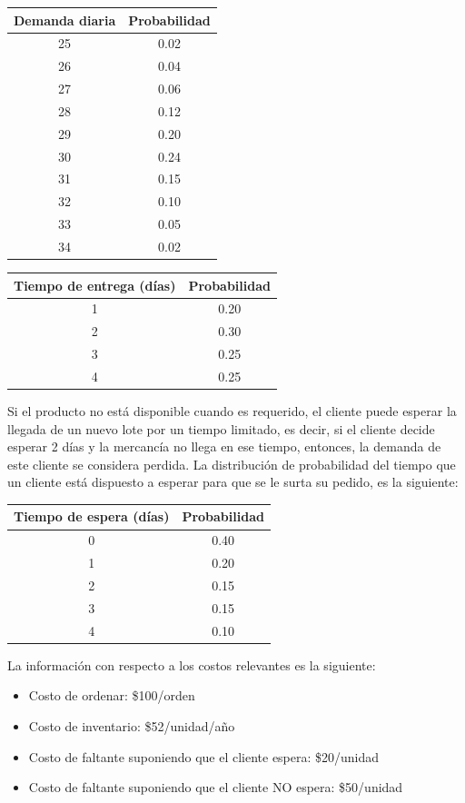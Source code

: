 \documentclass[12pt, a4paper]{article}
\begin{document}
\begin{center}
\begin{tabular}{cc}
\toprule
Demanda diaria & Probabilidad \\
\midrule
25 & 0.02 \\
26 & 0.04 \\
27 & 0.06 \\
28 & 0.12 \\
29 & 0.20 \\
30 & 0.24 \\
31 & 0.15 \\
32 & 0.10 \\
33 & 0.05 \\
34 & 0.02 \\
\bottomrule
\end{tabular}
\qquad
\begin{tabular}{cc}
\toprule
Tiempo de entrega (días) & Probabilidad \\
\midrule
1 & 0.20 \\
2 & 0.30 \\
3 & 0.25 \\
4 & 0.25 \\
\bottomrule
\end{tabular}
\end{center}

Si el producto no está disponible cuando es requerido, el cliente puede esperar la llegada de un nuevo lote por un tiempo limitado, es decir, si el cliente decide esperar 2 días y la mercancía no llega en ese tiempo, entonces, la demanda de este cliente se considera perdida. La distribución de probabilidad del tiempo que un cliente está dispuesto a esperar para que se le surta su pedido, es la siguiente:

\begin{center}
\begin{tabular}{cc}
\toprule
Tiempo de espera (días) & Probabilidad \\
\midrule
0 & 0.40 \\
1 & 0.20 \\
2 & 0.15 \\
3 & 0.15 \\
4 & 0.10 \\
\bottomrule
\end{tabular}
\end{center}

La información con respecto a los costos relevantes es la siguiente:

\begin{itemize}
    \item Costo de ordenar: \$100/orden
    \item Costo de inventario: \$52/unidad/año
    \item Costo de faltante suponiendo que el cliente espera: \$20/unidad
    \item Costo de faltante suponiendo que el cliente NO espera: \$50/unidad
\end{itemize}
\end{document}

